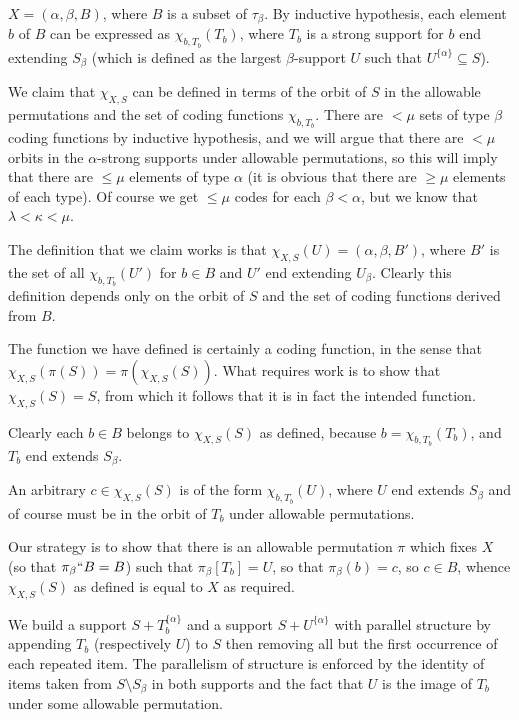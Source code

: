 $X = (\alpha,\beta,B)$, where $B$ is a subset of $\tau_\beta$.  By inductive hypothesis, each element $b$ of $B$ can be expressed as $\chi_{b,T_b}(T_b)$, where $T_b$ is a strong support for $b$ end extending $S_\beta$ (which is defined as the largest $\beta$-support $U$ such that $U^{\{\alpha\}} \subseteq S$).

We claim that $\chi_{X,S}$ can be defined in terms of the orbit of $S$ in the allowable permutations and the set of coding functions $\chi_{b,T_b}$.  There are $<\mu$ sets of type $\beta$ coding functions by inductive hypothesis, and we will argue that there are $<\mu$ orbits in the $\alpha$-strong supports under allowable permutations, so this will imply that there are $\leq \mu$ elements of type $\alpha$ (it is obvious that there are $\geq \mu$ elements of each type).
Of course we get $\leq \mu$ codes for each $\beta<\alpha$, but we know that $\lambda<\kappa<\mu$.

The definition that we claim works is that $\chi_{X,S}(U) = (\alpha,\beta,B')$, where $B'$ is the set of all $\chi_{b,T_b}(U')$ for $b \in B$ and $U'$ end extending $U_\beta$.  Clearly this definition depends only on the orbit of $S$ and the set of coding functions derived from $B$.

The function we have defined is certainly a coding function, in the sense that $\chi_{X,S}(\pi(S)) = \pi(\chi_{X,S}(S))$.  What requires work is to show that
$\chi_{X,S}(S)=S$, from which it follows that it is in fact the intended function.

Clearly each $b \in B$ belongs to $\chi_{X,S}(S)$ as defined, because $b = \chi_{b,T_b}(T_b)$, and $T_b$ end extends $S_\beta$.

An arbitrary $c \in \chi_{X,S}(S)$ is of the form $\chi_{b,T_b}(U)$, where $U$ end extends $S_\beta$ and of course must be in the orbit of $T_b$ under allowable permutations.

Our strategy is to show that there is an allowable permutation $\pi$ which fixes $X$ (so that $\pi_\beta``B = B$) such that $\pi_\beta[T_b]=U$, so that
$\pi_\beta(b) = c$, so $c \in B$, whence $\chi_{X,S}(S)$ as defined is equal to $X$ as required.

We build a support $S+T_b^{\{\alpha\}}$ and a support $S+U^{\{\alpha\}}$ with parallel structure by appending $T_b$ (respectively $U$) to $S$ then removing all but the first occurrence of each repeated item.  The parallelism of structure is enforced by the identity of items taken from $S \setminus S_\beta$
in both supports and the fact that $U$ is the image of $T_b$ under some allowable permutation.

